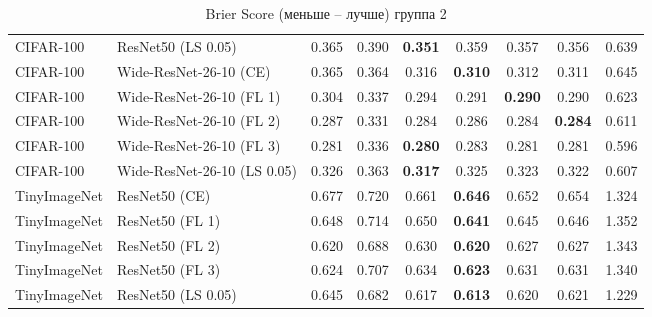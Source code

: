 \begin{table}[h!]
{\begin{tabular}{llccccccc}
   CIFAR-100 &          ResNet50 (LS 0.05) &         0.365 &        0.390 & \textbf{0.351} &                  0.359 &                  0.357 &                  0.356 &                  0.639 \\
   CIFAR-100 &      Wide-ResNet-26-10 (CE) &         0.365 &        0.364 &                  0.316 & \textbf{0.310} &                  0.312 &                  0.311 &                  0.645 \\
   CIFAR-100 &    Wide-ResNet-26-10 (FL 1) &         0.304 &        0.337 &                  0.294 &                  0.291 & \textbf{0.290} &                  0.290 &                  0.623 \\
   CIFAR-100 &    Wide-ResNet-26-10 (FL 2) &         0.287 &        0.331 &                  0.284 &                  0.286 &                  0.284 & \textbf{0.284} &                  0.611 \\
   CIFAR-100 &    Wide-ResNet-26-10 (FL 3) &         0.281 &        0.336 & \textbf{0.280} &                  0.283 &                  0.281 &                  0.281 &                  0.596 \\
   CIFAR-100 & Wide-ResNet-26-10 (LS 0.05) &         0.326 &        0.363 & \textbf{0.317} &                  0.325 &                  0.323 &                  0.322 &                  0.607 \\
TinyImageNet &               ResNet50 (CE) &         0.677 &        0.720 &                  0.661 & \textbf{0.646} &                  0.652 &                  0.654 &                  1.324 \\
TinyImageNet &             ResNet50 (FL 1) &         0.648 &        0.714 &                  0.650 & \textbf{0.641} &                  0.645 &                  0.646 &                  1.352 \\
TinyImageNet &             ResNet50 (FL 2) &         0.620 &        0.688 &                  0.630 & \textbf{0.620} &                  0.627 &                  0.627 &                  1.343 \\
TinyImageNet &             ResNet50 (FL 3) &         0.624 &        0.707 &                  0.634 & \textbf{0.623} &                  0.631 &                  0.631 &                  1.340 \\
TinyImageNet &          ResNet50 (LS 0.05) &         0.645 &        0.682 &                  0.617 & \textbf{0.613} &                  0.620 &                  0.621 &                  1.229 \\
\bottomrule
\end{tabular}%
}
\caption{Brier Score (меньше -- лучше) группа 2}
\label{tab:metrics:BS_2}
\end{table}
